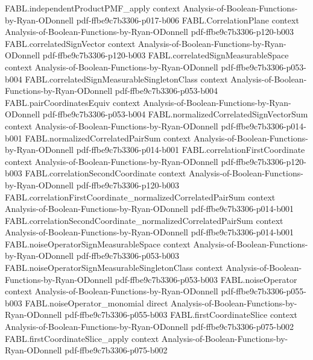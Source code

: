 \begin{theorem}
\proofstep
  {FABL.independentProductPMF_apply}
  {context}
  {Analysis-of-Boolean-Functions-by-Ryan-ODonnell}
  {pdf-ffbe9c7b3306-p017-b006}
\proofstep
  {FABL.CorrelationPlane}
  {context}
  {Analysis-of-Boolean-Functions-by-Ryan-ODonnell}
  {pdf-ffbe9c7b3306-p120-b003}
\proofstep
  {FABL.correlatedSignVector}
  {context}
  {Analysis-of-Boolean-Functions-by-Ryan-ODonnell}
  {pdf-ffbe9c7b3306-p120-b003}
\proofstep
  {FABL.correlatedSignMeasurableSpace}
  {context}
  {Analysis-of-Boolean-Functions-by-Ryan-ODonnell}
  {pdf-ffbe9c7b3306-p053-b004}
\proofstep
  {FABL.correlatedSignMeasurableSingletonClass}
  {context}
  {Analysis-of-Boolean-Functions-by-Ryan-ODonnell}
  {pdf-ffbe9c7b3306-p053-b004}
\proofstep
  {FABL.pairCoordinatesEquiv}
  {context}
  {Analysis-of-Boolean-Functions-by-Ryan-ODonnell}
  {pdf-ffbe9c7b3306-p053-b004}
\proofstep
  {FABL.normalizedCorrelatedSignVectorSum}
  {context}
  {Analysis-of-Boolean-Functions-by-Ryan-ODonnell}
  {pdf-ffbe9c7b3306-p014-b001}
\proofstep
  {FABL.normalizedCorrelatedPairSum}
  {context}
  {Analysis-of-Boolean-Functions-by-Ryan-ODonnell}
  {pdf-ffbe9c7b3306-p014-b001}
\proofstep
  {FABL.correlationFirstCoordinate}
  {context}
  {Analysis-of-Boolean-Functions-by-Ryan-ODonnell}
  {pdf-ffbe9c7b3306-p120-b003}
\proofstep
  {FABL.correlationSecondCoordinate}
  {context}
  {Analysis-of-Boolean-Functions-by-Ryan-ODonnell}
  {pdf-ffbe9c7b3306-p120-b003}
\proofstep
  {FABL.correlationFirstCoordinate_normalizedCorrelatedPairSum}
  {context}
  {Analysis-of-Boolean-Functions-by-Ryan-ODonnell}
  {pdf-ffbe9c7b3306-p014-b001}
\proofstep
  {FABL.correlationSecondCoordinate_normalizedCorrelatedPairSum}
  {context}
  {Analysis-of-Boolean-Functions-by-Ryan-ODonnell}
  {pdf-ffbe9c7b3306-p014-b001}
\proofstep
  {FABL.noiseOperatorSignMeasurableSpace}
  {context}
  {Analysis-of-Boolean-Functions-by-Ryan-ODonnell}
  {pdf-ffbe9c7b3306-p053-b003}
\proofstep
  {FABL.noiseOperatorSignMeasurableSingletonClass}
  {context}
  {Analysis-of-Boolean-Functions-by-Ryan-ODonnell}
  {pdf-ffbe9c7b3306-p053-b003}
\proofstep
  {FABL.noiseOperator}
  {context}
  {Analysis-of-Boolean-Functions-by-Ryan-ODonnell}
  {pdf-ffbe9c7b3306-p055-b003}
\proofstep
  {FABL.noiseOperator_monomial}
  {direct}
  {Analysis-of-Boolean-Functions-by-Ryan-ODonnell}
  {pdf-ffbe9c7b3306-p055-b003}
\proofstep
  {FABL.firstCoordinateSlice}
  {context}
  {Analysis-of-Boolean-Functions-by-Ryan-ODonnell}
  {pdf-ffbe9c7b3306-p075-b002}
\proofstep
  {FABL.firstCoordinateSlice_apply}
  {context}
  {Analysis-of-Boolean-Functions-by-Ryan-ODonnell}
  {pdf-ffbe9c7b3306-p075-b002}
\proofstep

\end{theorem}
